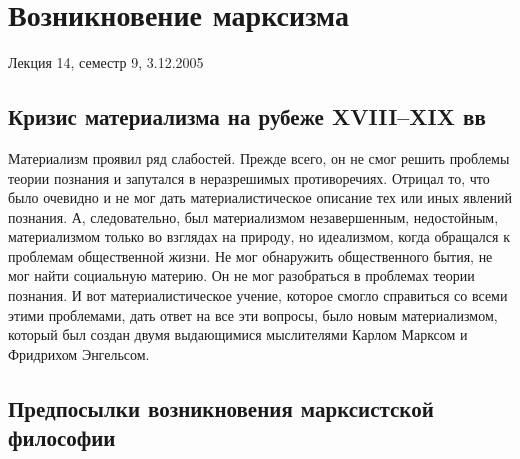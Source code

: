 

\section{Возникновение марксизма}
Лекция 14, семестр 9, 3.12.2005
\subsection{Кризис материализма на рубеже XVIII–XIX вв}

Материализм проявил ряд слабостей. Прежде всего, он не смог решить проблемы теории познания и запутался в неразрешимых противоречиях. Отрицал то, что было очевидно и не мог дать материалистическое описание тех или иных явлений познания. А, следовательно, был материализмом незавершенным, недостойным, материализмом только во взглядах на природу, но идеализмом, когда обращался к проблемам общественной жизни. Не мог обнаружить общественного бытия, не мог найти социальную материю. Он не мог разобраться в проблемах теории познания. И вот материалистическое учение, которое смогло справиться со всеми этими проблемами, дать ответ на все эти вопросы, было новым материализмом, который был создан двумя выдающимися мыслителями Карлом Марксом и Фридрихом Энгельсом.
\subsection{Предпосылки возникновения марксистской философии}

